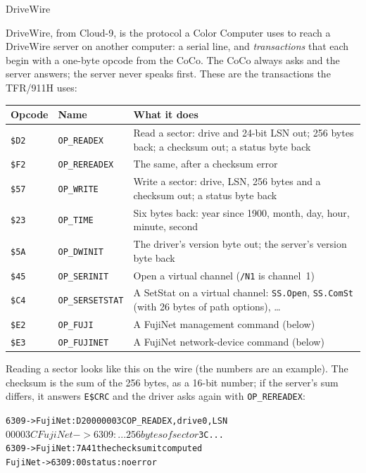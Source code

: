 \documentclass[10pt,twoside,openany]{book}
\makeatletter
\newcommand{\file}[1]{\texttt{#1}}           %
\newenvironment{exsmall}{\par\vspace{0.3ex}\scriptsize\begin{alltt}}{\end{alltt}\vspace{0.3ex}}
\renewcommand{\section}{\@startsection{section}{1}{0pt}{3.2ex plus 1ex}{1.2ex}%
  {\sffamily\bfseries\large}}
\makeatother
\begin{document}
\section{DriveWire}

DriveWire, from Cloud-9, is the protocol a Color Computer uses to reach a
DriveWire server on another computer: a serial line, and \emph{transactions} that each begin with a
one-byte opcode from the CoCo. The CoCo always asks and the server answers;
the server never speaks first. These are the transactions the TFR/911H
uses:

\begin{tabularx}{\linewidth}{@{}l l >{\raggedright\arraybackslash}X@{}}
\toprule
\textbf{Opcode} & \textbf{Name} & \textbf{What it does}\\
\midrule
\file{\$D2} & \texttt{OP\_READEX} & Read a sector: drive and 24-bit LSN out; 256 bytes back; a checksum out; a status byte back\\
\file{\$F2} & \texttt{OP\_REREADEX} & The same, after a checksum error\\
\file{\$57} & \texttt{OP\_WRITE} & Write a sector: drive, LSN, 256 bytes and a checksum out; a status byte back\\
\file{\$23} & \texttt{OP\_TIME} & Six bytes back: year since 1900, month, day, hour, minute, second\\
\file{\$5A} & \texttt{OP\_DWINIT} & The driver's version byte out; the server's version byte back\\
\file{\$45} & \texttt{OP\_SERINIT} & Open a virtual channel (\file{/N1} is channel~1)\\
\file{\$C4} & \texttt{OP\_SERSETSTAT} & A SetStat on a virtual channel: \texttt{SS.Open}, \texttt{SS.ComSt} (with 26 bytes of path options), \ldots\\
\file{\$E2} & \texttt{OP\_FUJI} & A FujiNet management command (below)\\
\file{\$E3} & \texttt{OP\_FUJINET} & A FujiNet network-device command (below)\\
\bottomrule
\end{tabularx}

Reading a sector looks like this on the wire (the numbers are an
example). The checksum is the sum of
the 256 bytes, as a 16-bit number; if the server's sum differs, it answers
\texttt{E\$CRC} and the driver asks again with \texttt{OP\_REREADEX}:
\begin{exsmall}
  6309 -> FujiNet:   D2  00  00 00 3C              OP_READEX, drive 0, LSN $00003C
  FujiNet -> 6309:   ... 256 bytes of sector $3C ...
  6309 -> FujiNet:   7A 41                         the checksum it computed
  FujiNet -> 6309:   00                            status: no error
\end{exsmall}
\end{document}
